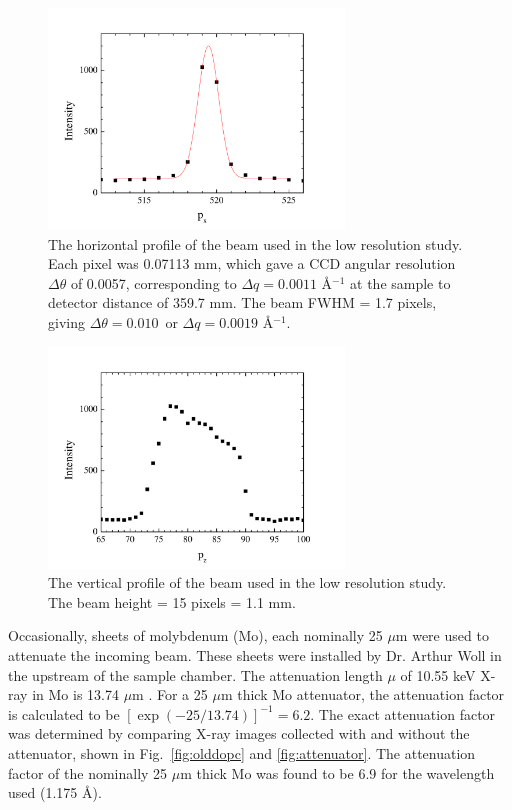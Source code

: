 \begin{figure}[htbp]
  \centering
  \includegraphics[width=0.7\textwidth]{figures/ripple/MMs/laxs/beamx_lr}
  \caption{The horizontal profile of the beam used in the low resolution study.
  Each pixel was 0.07113 mm, which gave a CCD angular resolution $\Delta\theta$ of 
  0.0057\textdegree, corresponding to $\Delta q=0.0011$ \AA$^{-1}$ at the 
  sample to detector distance of 359.7 mm. 
  The beam FWHM = 1.7 pixels, giving $\Delta\theta = 0.010$\textdegree\ or
  $\Delta q= 0.0019$ \AA$^{-1}$.}
  \label{fig:ripple_lr_beamx}
\end{figure}

\begin{figure}[htbp]
  \centering
  \includegraphics[width=0.7\textwidth]{figures/ripple/MMs/laxs/beamz_lr}
  \caption{The vertical profile of the beam used in the low resolution study.
  The beam height = 15 pixels = 1.1 mm.}
  \label{fig:ripple_lr_beamz}
\end{figure}

Occasionally, sheets of molybdenum (Mo), each nominally 25 $\mu$m were 
used to attenuate the incoming beam. 
These sheets were installed by Dr. Arthur Woll in the upstream of the sample chamber.
The attenuation length $\mu$ of 10.55 keV X-ray in Mo is 13.74 $\mu$m \cite{ref:cxro}.
For a 25 $\mu$m thick Mo attenuator, the attenuation factor is calculated to be
$[\exp(-25/13.74)]^{-1} = 6.2$. The exact attenuation factor was determined
by comparing X-ray images collected with and without the attenuator, 
shown in Fig.~\ref{fig:olddopc} and \ref{fig:attenuator}.
The attenuation factor of the nominally 25 $\mu$m thick Mo was found to 
be 6.9 for the wavelength used (1.175 \AA). 

